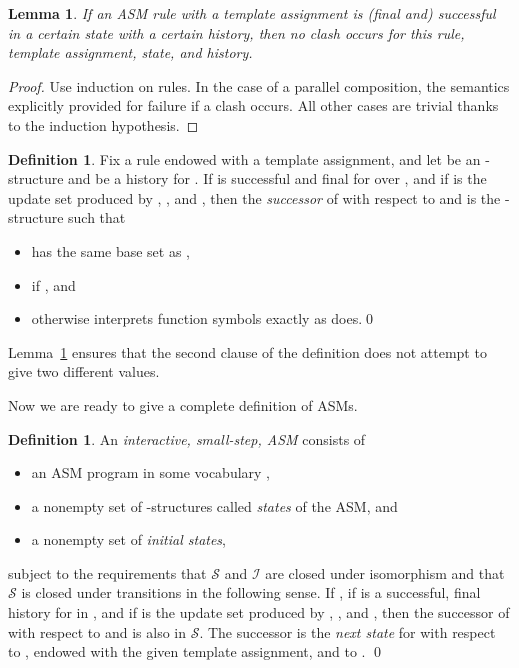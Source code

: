 \documentclass{LMCS}
\newtheorem{la}[thm]{Lemma}
\theoremstyle{definition}
\newtheorem{df}[thm]{Definition}
\newenvironment{ls}{\begin{itemize}}{\end{itemize}}
\newcommand{\scr}[1]{\ensuremath{\mathcal {#1}}}
\begin{document}
\begin{la}   \label{no-clash}
  If an ASM rule with a template assignment is (final and) successful
  in a certain state with a certain history, then no clash occurs for
  this rule, template assignment, state, and history.  
\end{la}

\begin{proof}
Use induction on rules.  In the case of a parallel composition, the
semantics explicitly provided for failure if a clash occurs.  All
other cases are trivial thanks to the induction hypothesis.
\end{proof}

\begin{df} \label{asm-next_state}
Fix a rule  endowed with a template assignment, and let  be an
-structure and  be a history for .  If  is successful and
final for  over , and if  is the update set produced by
, , and , then the \emph{successor}  of  with
respect to  and  is the -structure  such that
\begin{ls}
  \item  has the same base set as ,
  \item  if , and
  \item otherwise  interprets function symbols exactly as  does.\qed
\end{ls}
\end{df}

Lemma~\ref{no-clash} ensures that the second clause of
the definition does not attempt to give  two different
values. 

Now we are ready to give a complete definition of ASMs.

\begin{df}   \label{asm-def}
  An \emph{interactive, small-step, ASM} consists of
  \begin{ls}
    \item an ASM program  in some vocabulary ,
    \item a nonempty set  of -structures called \emph{states}
    of the ASM, and
    \item a nonempty set  of \emph{initial states},
  \end{ls}
subject to the requirements that \scr S and \scr I are closed under
isomorphism and that \scr S is closed under transitions in the following
sense.  If , if  is a successful, final history for 
in , and if  is the update set produced by , , and
, then the successor  of  with respect to  and
 is also in \scr S.  The successor is the \emph{next state} for 
with respect to , endowed with the given template assignment, and to
.  \qed
\end{df}
\end{document}
